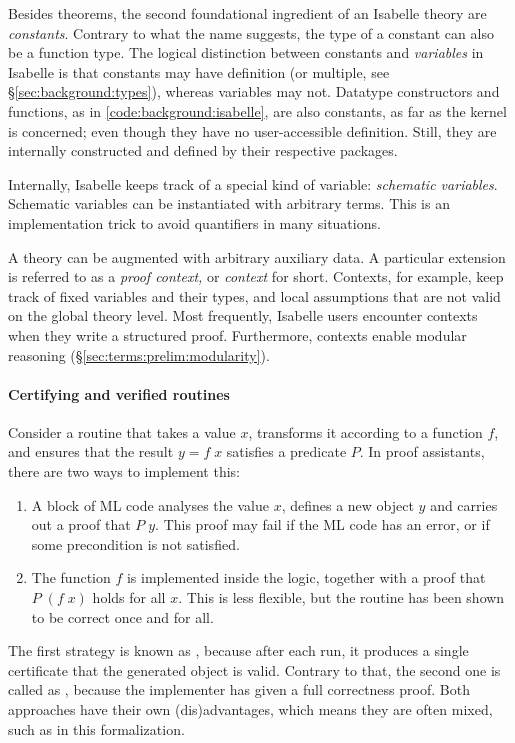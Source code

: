 Besides theorems, the second foundational ingredient of an Isabelle theory are \emph{constants}.
Contrary to what the name suggests, the type of a constant can also be a function type.
The logical distinction between constants and \emph{variables} in Isabelle is that constants may have definition (or multiple, see §\ref{sec:background:types}), whereas variables may not.
Datatype constructors and functions, as in \cref{code:background:isabelle}, are also constants, as far as the kernel is concerned; even though they have no user-accessible definition.
Still, they are internally constructed and defined by their respective packages.

Internally, Isabelle keeps track of a special kind of variable: \emph{schematic variables}.
Schematic variables can be instantiated with arbitrary terms.
This is an implementation trick to avoid quantifiers in many situations.

A theory can be augmented with arbitrary auxiliary data.
A particular extension is referred to as a \emph{proof context,} or \emph{context} for short.
Contexts, for example, keep track of fixed variables and their types, and local assumptions that are not valid on the global theory level.
Most frequently, Isabelle users encounter contexts when they write a structured proof.
Furthermore, contexts enable modular reasoning (§\ref{sec:terms:prelim:modularity}).

\paragraph{Certifying and verified routines}
Consider a routine that takes a value $x$, transforms it according to a function $f$, and ensures that the result $y = f\;x$ satisfies a predicate $P$.
In proof assistants, there are two ways to implement this:
\begin{enumerate}
  \item
    A block of ML code analyses the value $x$, defines a new object $y$ and carries out a proof that $P\;y$.
    This proof may fail if the ML code has an error, or if some precondition is not satisfied.
  \item
    The function $f$ is implemented inside the logic, together with a proof that $P\;(f\;x)$ holds for all $x$.
    This is less flexible, but the routine has been shown to be correct once and for all.
\end{enumerate}

\noindent
The first strategy is known as , because after each run, it produces a single certificate that the generated object is valid.
Contrary to that, the second one is called as , because the implementer has given a full correctness proof.
Both approaches have their own (dis)advantages, which means they are often mixed, such as in this formalization.

